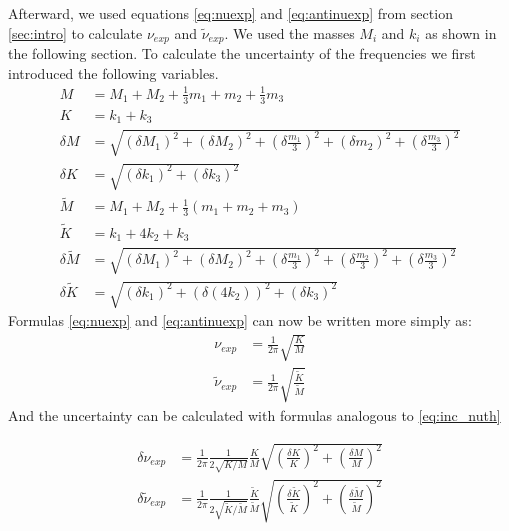 \documentclass{article}
\begin{document}
Afterward, we used equations \ref{eq:nuexp} and \ref{eq:antinuexp} from section \ref{sec:intro} to calculate
$\nu_{exp}$ and $\tilde \nu_{exp}$. We used the masses $M_i$ and $k_i$ as shown in the following section. To calculate the uncertainty of the frequencies we first introduced the following variables.
\begin{align}
    M &= M_1 + M_2 + \frac{1}{3} m_1 + m_2 + \frac{1}{3}m_3\\
    K &= k_1 + k_3 \\
    \delta M &= \sqrt{
        ( \delta M_1)^2 + ( \delta M_2)^2 + 
        ( \delta \frac{m_1}{3} )^2 + ( \delta m_2)^2 + 
        ( \delta \frac{m_3}{3} )^2} \\
    \delta K &= \sqrt{
        ( \delta k_1)^2 + ( \delta k_3)^2 } \\
    \tilde M &= M_1 + M_2 + \frac{1}{3} (m_1 + m_2 + m_3) \\
    \tilde K &= k_1 +4k_2 +k_3 \\
    \delta \tilde M &= \sqrt{
        ( \delta M_1)^2 + ( \delta M_2)^2 + 
        ( \delta \frac{m_1}{3} )^2 + 
        ( \delta \frac{m_2}{3} )^2 +
        ( \delta \frac{m_3}{3} )^2} \\
    \delta \tilde K &= \sqrt{
        ( \delta k_1)^2 + ( \delta (4k_2))^2 + 
        ( \delta k_3)^2 } 
\end{align}
Formulas \ref{eq:nuexp} and \ref{eq:antinuexp} can now be written more simply as:
\begin{align}
    \nu_{exp} &= \frac{1}{2\pi}   \sqrt{\frac{ K}{M}} \\
    \tilde \nu_{exp} &= \frac{1}{2\pi}   \sqrt{
    \frac{\tilde K}{\tilde M}  }
\end{align}
And the uncertainty can be calculated with formulas analogous to \ref{eq:inc_nuth}


\begin{align}
\delta \nu_{exp} &= \frac{1}{2\pi} 
        \frac{1}{2\sqrt{K/M}}  \frac{K}{M} 
        \sqrt{ \left ( \frac{ \delta K}{K}  \right ) ^2 +
               \left ( \frac{ \delta M}{M}  \right ) ^2  } \\
    \delta \tilde \nu_{exp} &= \frac{1}{2\pi} 
        \frac{1}{2\sqrt{\tilde K/\tilde M}}  \frac{\tilde K}{\tilde M} 
        \sqrt{ \left ( \frac{ \delta \tilde K}{\tilde K}  \right ) ^2 +
               \left ( \frac{ \delta \tilde M}{\tilde M}  \right ) ^2  } 
\end{align}
           
\end{document}
